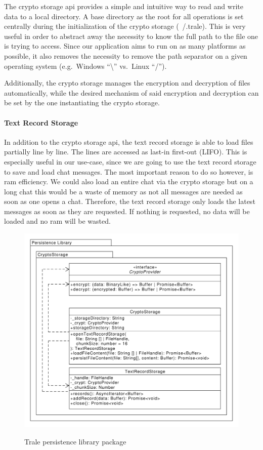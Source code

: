 The crypto storage \ac{api} provides a simple and intuitive way to read and write data to a local directory.
A base directory as the root for all operations is set centrally during the initialization of the crypto storage
(~/.trale).
This is very useful in order to abstract away the necessity to know the full path to the file one is trying to access.
Since our application aims to run on as many platforms as possible, it also removes the necessity to remove the path
separator on a given operating system (e.g.\ Windows \enquote{\textbackslash} vs.\ Linux \enquote{/}).

Additionally, the crypto storage manages the encryption and decryption of files automatically, while the desired
mechanism of said encryption and decryption can be set by the one instantiating the crypto storage.

\paragraph{Text Record Storage}

In addition to the crypto storage \ac{api}, the text record storage is able to load files partially line by line.
The lines are accessed as last-in first-out (LIFO).
This is especially useful in our use-case, since we are going to use the text record storage to save and load chat
messages.
The most important reason to do so however, is \ac{ram} efficiency.
We could also load an entire chat via the crypto storage but on a long chat this would be a waste of memory as not all
messages are needed as soon as one opens a chat.
Therefore, the text record storage only loads the latest messages as soon as they are requested.
If nothing is requested, no data will be loaded and no \ac{ram} will be wasted.
\begin{figure}[H]
    \centering
    \caption{Trale persistence library package}
    \includegraphics[width=1\textwidth]{./graphics/classDiagramPersistenceLibrary}
    \label{fig:figure38}
\end{figure}

